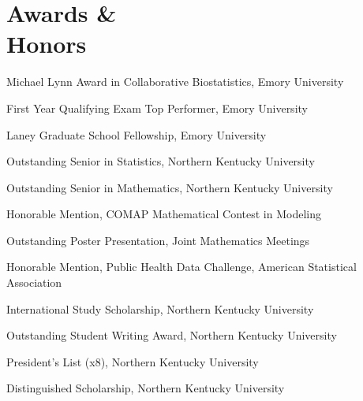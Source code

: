 \section{Awards \& \\ Honors}

Michael Lynn Award in Collaborative Biostatistics, Emory University \hfill {}

First Year Qualifying Exam Top Performer, Emory University \hfill {}

Laney Graduate School Fellowship, Emory University \hfill {}

Outstanding Senior in Statistics, Northern Kentucky University \hfill {}

Outstanding Senior in Mathematics, Northern Kentucky University \hfill {}

Honorable Mention, COMAP Mathematical Contest in Modeling \hfill {}

Outstanding Poster Presentation, Joint Mathematics Meetings \hfill {}

Honorable Mention, Public Health Data Challenge, American Statistical Association \hfill {}

International Study Scholarship, Northern Kentucky University \hfill {}

Outstanding Student Writing Award, Northern Kentucky University \hfill {}

President's List (x8), Northern Kentucky University \hfill {}

Distinguished Scholarship, Northern Kentucky University \hfill {}


